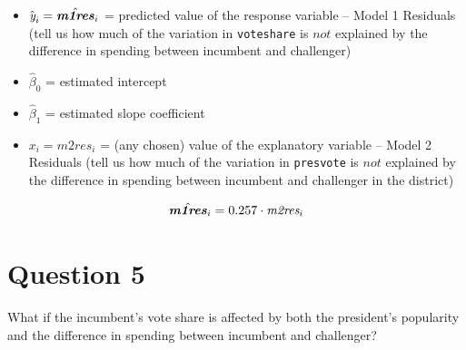 \documentclass[12pt,letterpaper]{article}
\begin{document}
\begin{enumerate}
\begin{flushleft}
	
	\begin{itemize}
		\item $\hat{\textit{y}}_i = \hat{\textbf{\textit{m1res}}}_i$ = predicted value of the response variable -- Model 1 Residuals (tell us how much of the variation in \texttt{voteshare} is $not$ explained by the difference in spending between incumbent and challenger)
		\item $\hat{\beta}_0$ = estimated intercept
		\item $\hat{\beta}_1$ = estimated slope coefficient
		\item $x_i = \textit{m2res}_i$ = (any chosen) value of the explanatory variable -- Model 2 Residuals (tell us how much of the variation in \texttt{presvote} is $not$ explained by the difference in spending between incumbent and challenger in the district) 
	\end{itemize}
	
\end{flushleft}
\[\hat{\textbf{\textit{m1res}}}_i  =  0.257\cdot  \textit{m2res}_i
\]

		\end{enumerate}

\section*{Question 5}
\noindent What if the incumbent's vote share is affected by both the president's popularity and the difference in spending between incumbent and challenger? 
\end{document}
